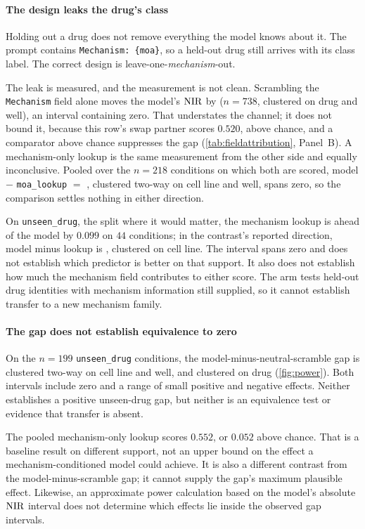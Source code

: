 \paragraph{The design leaks the drug's class} Holding out a drug does not
remove everything the model knows about it. The prompt contains
\texttt{Mechanism: \{moa\}}, so a held-out drug still arrives with its class
label. The correct design is leave-one-\emph{mechanism}-out.

The leak is measured, and the measurement is not clean. Scrambling the
\texttt{Mechanism} field alone moves the model's $\textrm{NIR}$ by
 ($n = \num{738}$, clustered on drug and well), an
interval containing zero. That understates the channel; it does not bound it,
because this row's swap partner scores $0.520$, above chance, and a comparator
above chance suppresses the gap (\cref{tab:fieldattribution}, Panel~B). A
mechanism-only lookup is the same measurement from the other side and equally
inconclusive. Pooled over the $n = \num{218}$ conditions on which both are
scored, model $-$ \texttt{moa\_lookup} $=$ ,
clustered two-way on cell line and well, spans zero, so the comparison settles
nothing in either direction.

On \texttt{unseen\_drug}, the split where it would matter, the mechanism lookup
is ahead of the model by $0.099$ on $44$ conditions; in the contrast's reported
direction, model minus lookup is , clustered on cell
line. The interval spans zero and does not establish which predictor is better
on that support. It also does not establish how much the mechanism field
contributes to either score. The arm tests held-out drug identities with
mechanism information still supplied, so it cannot establish transfer to a new
mechanism family.

\paragraph{The gap does not establish equivalence to zero} On the $n = 199$
\texttt{unseen\_drug} conditions, the model-minus-neutral-scramble gap is
 clustered two-way on cell line and well, and
 clustered on drug (\cref{fig:power}). Both
intervals include zero and a range of small positive and negative effects.
Neither establishes a positive unseen-drug gap, but neither is an equivalence
test or evidence that transfer is absent.

The pooled mechanism-only lookup scores $0.552$, or $0.052$ above chance.
That is a baseline result on different support, not an upper bound on the
effect a mechanism-conditioned model could achieve. It is also a different
contrast from the model-minus-scramble gap; it cannot supply the gap's maximum
plausible effect. Likewise, an approximate power calculation based on the
model's absolute $\textrm{NIR}$ interval does not determine which effects lie inside
the observed gap intervals.


